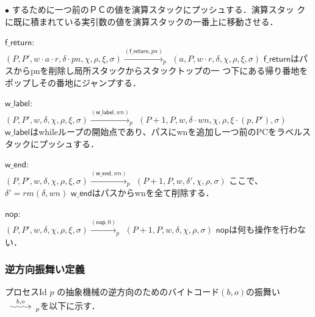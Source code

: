 \documentclass[submit,PRO]{ipsj}
\makeatletter
\newcommand{\longsquiggly}{\xymatrix{{}\ar@{~>}[r]&{}}}
\newcommand{\bcode}[1]{$\mathsf{#1}$}
\newcommand{\brightarrow}[1]{\stackrel{#1}{\longsquiggly}}
\makeatother
\begin{document}
\begin{list}{$\bullet$}{}
      するために一つ前のＰＣの値を演算スタックにプッシュする．演算スタッ
      クに既に積まれている実引数の値を演算スタックの一番上に移動させる．
\item \bcode{f\_return}:\\
$(P,P',w\cdot a\cdot r,\delta\cdot pn,\chi,\rho,\xi,\sigma)\xrightarrow{(\mathsf{f\_return},pn)}_p$\newline
\qquad $(a,P,w\cdot r,\delta,\chi,\rho,\xi,\sigma)$\newline
\bcode{f\_return}はパスからpnを削除し局所スタックからスタックトップの一
      つ下にある帰り番地をポップしその番地にジャンプする．
\item \bcode{w\_label}:\\
$(P,P',w,\delta,\chi,\rho,\xi,\sigma)\xrightarrow{(\mathsf{w\_label},wn)}_p$\newline
\qquad $(P+1,P,w,\delta\cdot wn,\chi,\rho,\xi\cdot(p,P'),\sigma)$\newline
\bcode{w\_label}はwhileループの開始点であり、パスにwnを追加し一つ前のPCをラベルスタックにプッシュする．
\item \bcode{w\_end}:\\
$(P,P',w,\delta,\chi,\rho,\xi,\sigma)\xrightarrow{(\mathsf{w\_end},wn)}_p$\newline
\qquad $(P+1,P,w,\delta',\chi,\rho,\sigma)$\newline
ここで、$\delta'=rm(\delta,wn)$\newline
\bcode{w\_end}はパスからwnを全て削除する．
\item \bcode{nop}:\\
$(P,P',w,\delta,\chi,\rho,\xi,\sigma)\xrightarrow{(\mathsf{nop},0)}_p$\newline
\qquad $(P+1,P,w,\delta,\chi,\rho,\sigma)$\newline
\bcode{nop}は何も操作を行わない．
\end{list}

\subsubsection{逆方向振舞い定義}

プロセスId $p$ の抽象機械の逆方向のためのバイトコード$(b,o)$の振舞い
$\brightarrow{b,o}_{p}$を以下に示す．
\end{document}

